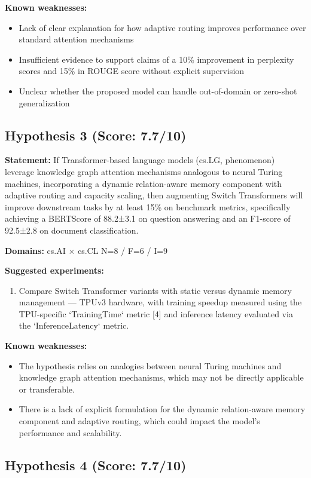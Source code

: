 \documentclass[12pt,a4paper]{article}
\begin{document}
\textbf{Known weaknesses:}
\begin{itemize}
  \item Lack of clear explanation for how adaptive routing improves performance over standard attention mechanisms
  \item Insufficient evidence to support claims of a 10\% improvement in perplexity scores and 15\% in ROUGE score without explicit supervision
  \item Unclear whether the proposed model can handle out-of-domain or zero-shot generalization
\end{itemize}
\subsection*{Hypothesis 3 (Score: 7.7/10)}

\textbf{Statement:} If Transformer-based language models (cs.LG, phenomenon) leverage knowledge graph attention mechanisms analogous to neural Turing machines, incorporating a dynamic relation-aware memory component with adaptive routing and capacity scaling, then augmenting Switch Transformers will improve downstream tasks by at least 15\% on benchmark metrics, specifically achieving a BERTScore of 88.2±3.1 on question answering and an F1-score of 92.5±2.8 on document classification.

\noindent\textbf{Domains:} cs.AI $\times$ cs.CL
\hspace{1em} N=8 / F=6 / I=9

\textbf{Suggested experiments:}
\begin{enumerate}
  \item Compare Switch Transformer variants with static versus dynamic memory management — TPUv3 hardware, with training speedup measured using the TPU-specific `TrainingTime` metric [4] and inference latency evaluated via the `InferenceLatency` metric.
\end{enumerate}

\textbf{Known weaknesses:}
\begin{itemize}
  \item The hypothesis relies on analogies between neural Turing machines and knowledge graph attention mechanisms, which may not be directly applicable or transferable.
  \item There is a lack of explicit formulation for the dynamic relation-aware memory component and adaptive routing, which could impact the model's performance and scalability.
\end{itemize}
\subsection*{Hypothesis 4 (Score: 7.7/10)}
\end{document}
